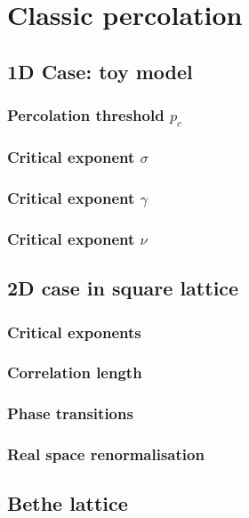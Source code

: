 
\chapter{Classic percolation}

\label{ch:classicpercolation} %



\section{1D Case: toy model}\label{sec:1d}

\subsection{Percolation threshold $p_c$}

\subsection{Critical exponent $\sigma$}

\subsection{Critical exponent $\gamma$}

\subsection{Critical exponent $\nu$}



\section{2D case in square lattice}\label{sec:2dsquare}


\subsection{Critical exponents}

\subsection{Correlation length}

\subsection{Phase transitions}

\subsection{Real space renormalisation}



\section{Bethe lattice}\label{sec:2dgeneral}




